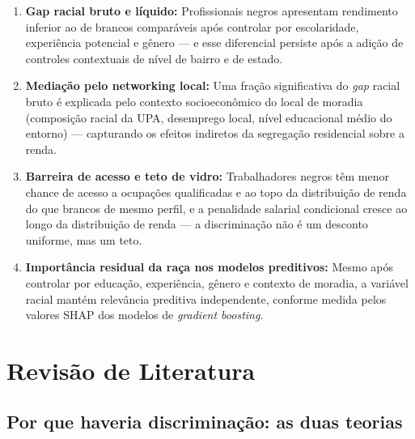 \documentclass[12pt, a4paper, oneside]{article}
\let\oldsubsectionFB\subsection
\renewcommand{\subsection}{\FloatBarrier\oldsubsectionFB}
\begin{document}
\begin{enumerate}
  \item[\textbf{H1}] \textbf{Gap racial bruto e líquido:}
    Profissionais negros apresentam rendimento inferior ao de brancos
    comparáveis após controlar por escolaridade, experiência potencial
    e gênero --- e esse diferencial persiste após a adição de controles
    contextuais de nível de bairro e de estado.

  \item[\textbf{H2}] \textbf{Mediação pelo networking local:}
    Uma fração significativa do \textit{gap} racial bruto é explicada
    pelo contexto socioeconômico do local de moradia (composição racial da
    UPA, desemprego local, nível educacional médio do entorno) ---
    capturando os efeitos indiretos da segregação residencial sobre a renda.

  \item[\textbf{H3}] \textbf{Barreira de acesso e teto de vidro:}
    Trabalhadores negros têm menor chance de acesso a ocupações qualificadas
    e ao topo da distribuição de renda do que brancos de mesmo perfil, e a
    penalidade salarial condicional cresce ao longo da distribuição de renda
    --- a discriminação não é um desconto uniforme, mas um teto.

  \item[\textbf{H4}] \textbf{Importância residual da raça nos modelos preditivos:}
    Mesmo após controlar por educação, experiência, gênero e contexto de
    moradia, a variável racial mantém relevância preditiva independente,
    conforme medida pelos valores SHAP dos modelos de \textit{gradient boosting}.

\end{enumerate}

\section{Revisão de Literatura}
\label{sec:revisao}

\subsection{Por que haveria discriminação: as duas teorias}
\end{document}
